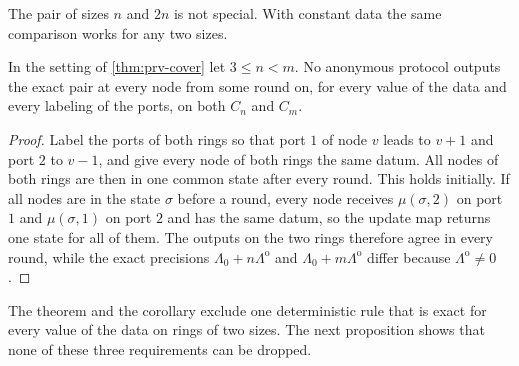 The pair of sizes $n$ and $2n$ is not special. With constant data the same comparison works for any two sizes.

\begin{corollary}\label{cor:prv-sizes}
In the setting of \cref{thm:prv-cover} let $3\le n<m$. No anonymous protocol outputs the exact pair at every node from some round on, for every value of the data and every labeling of the ports, on both $C_n$ and $C_m$.
\end{corollary}

\begin{proof}
Label the ports of both rings so that port $1$ of node $v$ leads to $v+1$ and port $2$ to $v-1$, and give every node of both rings the same datum. All nodes of both rings are then in one common state after every round. This holds initially. If all nodes are in the state $\sigma$ before a round, every node receives $\mu(\sigma,2)$ on port $1$ and $\mu(\sigma,1)$ on port $2$ and has the same datum, so the update map returns one state for all of them. The outputs on the two rings therefore agree in every round, while the exact precisions $\Lambda_0+n\Lambda^{\mathrm o}$ and $\Lambda_0+m\Lambda^{\mathrm o}$ differ because $\Lambda^{\mathrm o}\ne0$.
\end{proof}

The theorem and the corollary exclude one deterministic rule that is exact for every value of the data on rings of two sizes. The next proposition shows that none of these three requirements can be dropped.

